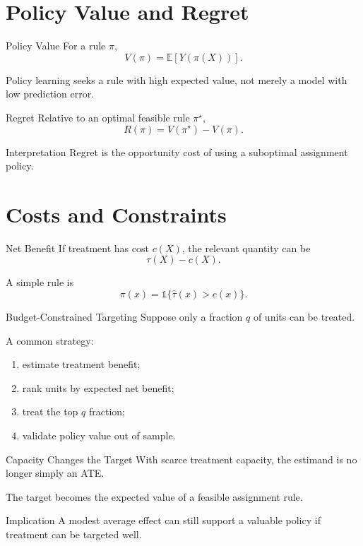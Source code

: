 \documentclass[aspectratio=169,11pt]{beamer}
\newcommand{\E}{\mathbb{E}}
\begin{document}
\section{Policy Value and Regret}

\begin{frame}{Policy Value}
For a rule \(\pi\),
\[
V(\pi)=\E[Y(\pi(X))].
\]

Policy learning seeks a rule with high expected value, not merely a model with low prediction error.
\end{frame}

\begin{frame}{Regret}
Relative to an optimal feasible rule \(\pi^\star\),
\[
R(\pi)=V(\pi^\star)-V(\pi).
\]

\begin{block}{Interpretation}
Regret is the opportunity cost of using a suboptimal assignment policy.
\end{block}
\end{frame}

\section{Costs and Constraints}

\begin{frame}{Net Benefit}
If treatment has cost \(c(X)\), the relevant quantity can be
\[
\tau(X)-c(X).
\]

A simple rule is
\[
\pi(x)=\mathbb{1}\{\widehat\tau(x)>c(x)\}.
\]
\end{frame}

\begin{frame}{Budget-Constrained Targeting}
Suppose only a fraction \(q\) of units can be treated.

A common strategy:
\begin{enumerate}
\item estimate treatment benefit;
\item rank units by expected net benefit;
\item treat the top \(q\) fraction;
\item validate policy value out of sample.
\end{enumerate}
\end{frame}

\begin{frame}{Capacity Changes the Target}
With scarce treatment capacity, the estimand is no longer simply an ATE.

The target becomes the expected value of a feasible assignment rule.

\begin{alertblock}{Implication}
A modest average effect can still support a valuable policy if treatment can be targeted well.
\end{alertblock}
\end{frame}
\end{document}

